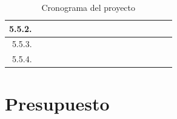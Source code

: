 \documentclass[12pt]{article}
\begin{document}
\begin{table}[H]
{\begin{tabular}{|rllllllllllllllll|}
        \multicolumn{1}{|r|}{5.5.2.} & \multicolumn{1}{l|}{} & \multicolumn{1}{l|}{} & \multicolumn{1}{l|}{} & \multicolumn{1}{l|}{} & \multicolumn{1}{l|}{} & \multicolumn{1}{l|}{} & \multicolumn{1}{l|}{} & \multicolumn{1}{l|}{} & \multicolumn{1}{l|}{} & \multicolumn{1}{l|}{} & \multicolumn{1}{l|}{} & \multicolumn{1}{l|}{} & \multicolumn{1}{c|}{\cellcolor[HTML]{B4A7D6}} & \multicolumn{1}{c|}{\cellcolor[HTML]{EA9999}} & \multicolumn{1}{c|}{\cellcolor[HTML]{EA9999}} & \multicolumn{1}{c|}{\cellcolor[HTML]{EA9999}} \\ \hline
        \multicolumn{1}{|r|}{5.5.3.} & \multicolumn{1}{l|}{} & \multicolumn{1}{l|}{} & \multicolumn{1}{l|}{} & \multicolumn{1}{l|}{} & \multicolumn{1}{l|}{} & \multicolumn{1}{l|}{} & \multicolumn{1}{l|}{} & \multicolumn{1}{l|}{} & \multicolumn{1}{l|}{} & \multicolumn{1}{l|}{} & \multicolumn{1}{l|}{} & \multicolumn{1}{l|}{} & \multicolumn{1}{c|}{\cellcolor[HTML]{B4A7D6}} & \multicolumn{1}{c|}{\cellcolor[HTML]{EA9999}} & \multicolumn{1}{c|}{\cellcolor[HTML]{EA9999}} & \multicolumn{1}{c|}{\cellcolor[HTML]{EA9999}} \\ \hline
        \multicolumn{1}{|r|}{5.5.4.} & \multicolumn{1}{l|}{} & \multicolumn{1}{l|}{} & \multicolumn{1}{l|}{} & \multicolumn{1}{l|}{} & \multicolumn{1}{l|}{} & \multicolumn{1}{l|}{} & \multicolumn{1}{l|}{} & \multicolumn{1}{l|}{} & \multicolumn{1}{l|}{} & \multicolumn{1}{l|}{} & \multicolumn{1}{l|}{} & \multicolumn{1}{c|}{\cellcolor[HTML]{B4A7D6}} & \multicolumn{1}{c|}{\cellcolor[HTML]{B4A7D6}} & \multicolumn{1}{c|}{\cellcolor[HTML]{EA9999}} & \multicolumn{1}{c|}{\cellcolor[HTML]{EA9999}} & \multicolumn{1}{c|}{\cellcolor[HTML]{EA9999}} \\ \hline
        \end{tabular}%
        }
        \caption[Tabla]{Cronograma del proyecto}
        \label{tab:cron}
        \end{table}

    \section{Presupuesto}
    
\end{document}
